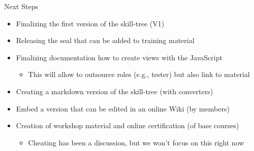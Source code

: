 \documentclass[compress,aspectratio=169]{beamer}
\begin{document}
\begin{frame}{Next Steps}
		\begin{itemize}
			\item Finalizing the first version of the skill-tree (V1)
			\item Releasing the seal that can be added to training material
			\item Finalizing documentation how to create views with the JavaScript
        \begin{itemize}
          \item This will allow to outsource roles (e.g., tester) but also link to material
        \end{itemize}
      \item Creating a markdown version of the skill-tree (with converters)
      \item Embed a version that can be edited in an online Wiki (by members)
      \item Creation of workshop material and online certification (of base courses)
        \begin{itemize}
          \item Cheating has been a discussion, but we won't focus on this right now
        \end{itemize}
		\end{itemize}
  \label{frame:last}
\end{frame}
\end{document}
